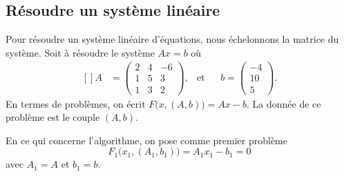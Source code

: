 \subsection{Résoudre un système linéaire}

Pour résoudre un système linéaire d'équations, nous échelonnons la matrice du système. Soit à résoudre le système $Ax=b$ où
\begin{equation}
	\begin{aligned}[]
		A&=\begin{pmatrix}
			2   &   4   &   -6  \\
			1   &   5   &   3   \\
			1   &   3   &   2
		\end{pmatrix}, &\text{et}&&b=\begin{pmatrix}
			-4  \\
			10  \\
			5
		\end{pmatrix}.
	\end{aligned}
\end{equation}
En termes de problèmes, on écrit $F\big( x,(A,b) \big)=Ax-b$. La donnée de ce problème est le couple $(A,b)$.

En ce qui concerne l'algorithme, on pose comme premier problème
\begin{equation}
	F_1\big(x_1,(A_1,b_1)\big)=A_1x_1-b_1=0
\end{equation}
avec $A_1=A$ et $b_1=b$.

